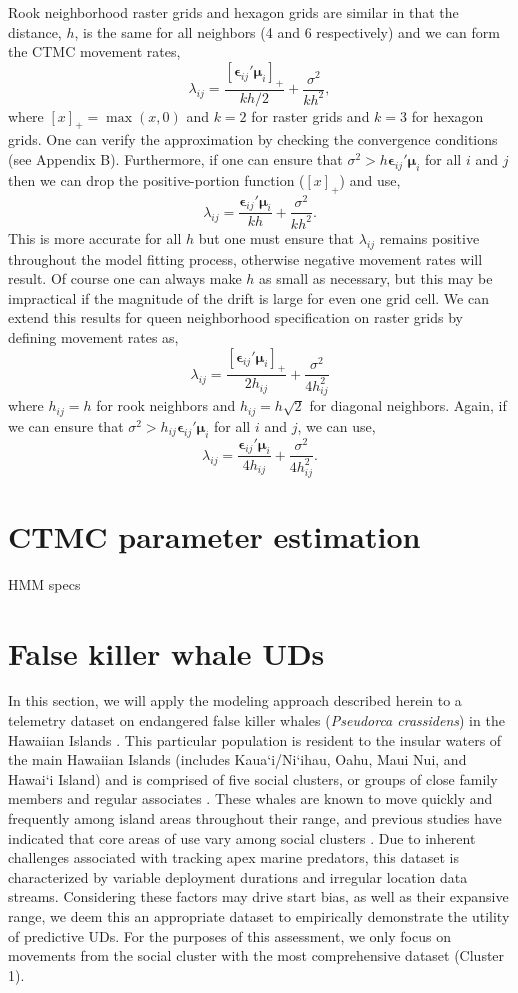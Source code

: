 \documentclass[12pt]{article}
\newcommand{\be}{\ensuremath{\boldsymbol{\epsilon}}}
\newcommand{\bmu}{\ensuremath{\boldsymbol{\mu}}}
\begin{document}
Rook neighborhood raster grids and hexagon grids are similar in that the distance, $h$, is the same for all neighbors (4 and 6 respectively) and we can form the CTMC movement rates, 
\[
\lambda_{ij} = \frac{[\be_{ij}'\bmu_i]_+}{kh/2} + \frac{\sigma^2}{kh^2}, 
\]
where $[x]_+= \max(x, 0)$ and $k = 2$ for raster grids and $k=3$ for hexagon grids. One can verify the approximation by checking the convergence conditions (see Appendix B). Furthermore, if one can ensure that $\sigma^2 > h\be_{ij}'\bmu_i$ for all $i$ and $j$ then we can drop the positive-portion function ($[x]_+$) and use,
\[
\lambda_{ij} = \frac{\be_{ij}'\bmu_i}{kh} + \frac{\sigma^2}{kh^2}.
\]
This is more accurate for all $h$ but one must ensure that $\lambda_{ij}$ remains positive throughout the model fitting process, otherwise negative movement rates will result. Of course one can always make $h$ as small as necessary, but this may be impractical if the magnitude of the drift is large for even one grid cell. We can extend this results for queen neighborhood specification on raster grids by defining movement rates as,
\[
\lambda_{ij}= \frac{[\be_{ij}'\bmu_i]_+}{2h_{ij}} + \frac{\sigma^2}{4h_{ij}^2} 
\]
where $h_{ij}=h$ for rook neighbors and $h_{ij} = h\sqrt{2}$ for diagonal neighbors. Again, if we can ensure that $\sigma^2 > h_{ij} \be_{ij}'\bmu_i$ for all $i$ and $j$, we can use,
\[
\lambda_{ij}= \frac{\be_{ij}'\bmu_i}{4h_{ij}} + \frac{\sigma^2}{4h_{ij}^2}. 
\]
 
\section{CTMC parameter estimation}

HMM specs

\section{False killer whale UDs}

In this section, we will apply the modeling approach described herein to a telemetry dataset on endangered false killer whales (\emph{Pseudorca crassidens}) in the Hawaiian Islands \citep{baird2016lives}. This particular population is resident to the insular waters of the main Hawaiian Islands (includes Kaua`i/Ni`ihau, Oahu, Maui Nui, and Hawai`i Island) and is comprised of five social clusters, or groups of close family members and regular associates \citep{baird2008false, baird2019cooperative, baird2016lives, martien2019fidelity}. These whales are known to move quickly and frequently among island areas throughout their range, and previous studies have indicated that core areas of use vary among social clusters \citep{baird2010movements, baird2012range, baird2021bringing, baird2016lives}. Due to inherent challenges associated with tracking apex marine predators, this dataset is characterized by variable deployment durations and irregular location data streams. Considering these factors may drive start bias, as well as their expansive range, we deem this an appropriate dataset to empirically demonstrate the utility of predictive UDs. For the purposes of this assessment, we only focus on movements from the social cluster with the most comprehensive dataset (Cluster 1). 
\end{document}
